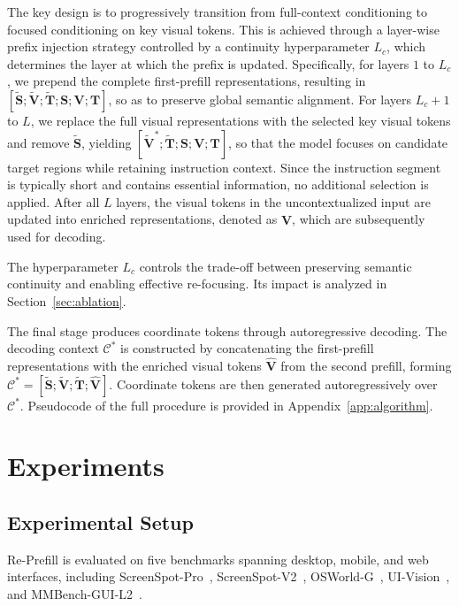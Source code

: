 \documentclass{article}
\begin{document}
The key design is to progressively transition from full-context conditioning to focused conditioning on key visual tokens. This is achieved through a layer-wise prefix injection strategy controlled by a continuity hyperparameter $L_c$, which determines the layer at which the prefix is updated.
Specifically, for layers $1$ to $L_c$, we prepend the complete first-prefill representations, resulting in $[\tilde{\mathbf{S}};\tilde{\mathbf{V}};\tilde{\mathbf{T}};\mathbf{S};\mathbf{V};\mathbf{T}]$, so as to preserve global semantic alignment.
For layers $L_c + 1$ to $L$, we replace the full visual representations with the selected key visual tokens and remove $\tilde{\mathbf{S}}$, yielding $[\tilde{\mathbf{V}}^{*};\tilde{\mathbf{T}};\mathbf{S};\mathbf{V};\mathbf{T}]$, so that the model focuses on candidate target regions while retaining instruction context. Since the instruction segment is typically short and contains essential information, no additional selection is applied.
After all $L$ layers, the visual tokens in the uncontextualized input are updated into enriched representations, denoted as $\hat{\mathbf{V}}$, which are subsequently used for decoding.

The hyperparameter $L_c$ controls the trade-off between preserving semantic continuity and enabling effective re-focusing. Its impact is analyzed in Section~\ref{sec:ablation}.


The final stage produces coordinate tokens through autoregressive decoding. The decoding context $\mathcal{C}^{*}$ is constructed by concatenating the first-prefill representations with the enriched visual tokens $\hat{\mathbf{V}}$ from the second prefill, forming $\mathcal{C}^{*} = [\tilde{\mathbf{S}};\tilde{\mathbf{V}};\tilde{\mathbf{T}};\hat{\mathbf{V}}]$. Coordinate tokens are then generated autoregressively over $\mathcal{C}^{*}$. Pseudocode of the full procedure is provided in Appendix~\ref{app:algorithm}.

\section{Experiments}
\label{sec:experiments}


\subsection{Experimental Setup}
\label{sec:setup}

Re-Prefill is evaluated on five benchmarks spanning desktop, mobile, and web interfaces, including ScreenSpot-Pro~\citep{sspro}, ScreenSpot-V2~\citep{osatlas}, OSWorld-G~\citep{osworldg}, UI-Vision~\citep{uivision}, and MMBench-GUI-L2~\citep{mmbench}.
\end{document}
